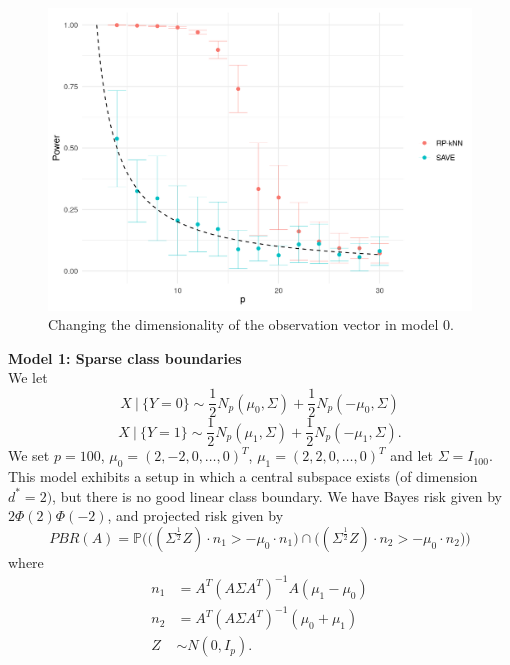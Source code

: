 \documentclass[12pt]{article}
\begin{document}
\begin{figure}[htbp]
    \centering
    \includegraphics[width=5in]{../results/figures/Model0Changingp.png}
    \caption{Changing the dimensionality of the observation vector in model 0.\label{fig:Model-Changingp}}
\end{figure}

\noindent\textbf{Model 1: Sparse class boundaries}\\
We let 
\[X \ | \ \{Y = 0\} \sim \frac{1}{2}N_p(\mu_0, \Sigma) + \frac{1}{2}N_p(-\mu_0, \Sigma) \]
\[X \ | \ \{ Y = 1\} \sim \frac{1}{2}N_p(\mu_1, \Sigma) + \frac{1}{2}N_p(-\mu_1, \Sigma). \]
We set $p=100$, $\mu_0 = (2, -2, 0, \ldots, 0)^T$, $\mu_1 = (2, 2, 0, \ldots, 0)^T$ and let $\Sigma = I_{100}$. This model exhibits a setup in which a central subspace exists (of dimension $d^* = 2)$, but there is no good linear class boundary. We have Bayes risk given by $2\Phi(2)\Phi(-2)$, and projected risk given by 
\[ PBR(A) = \mathbb{P}\Big( \big((\Sigma^{\frac{1}{2}}Z) \cdot n_1 > - \mu_0 \cdot n_1 \big)  \cap \big( (\Sigma^{\frac{1}{2}}Z) \cdot n_2 > - \mu_0 \cdot n_2 \big) \Big) \]
where 
\begin{align*}
    n_1 & = A^T(A\Sigma A^T)^{-1}A(\mu_1 - \mu_0) \\
    n_2 & = A^T(A \Sigma A^T)^{-1} (\mu_0 + \mu_1) \\
    Z & \sim N(0, I_p).
\end{align*}

~\\
\end{document}
